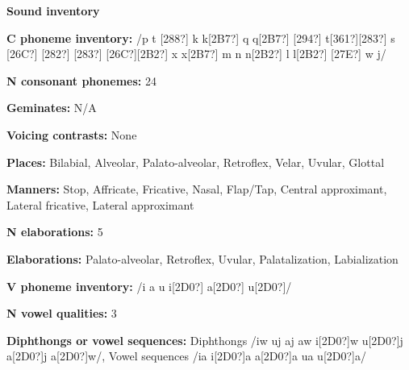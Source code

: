 \begin{styleBody}
\textbf{Sound inventory}
\end{styleBody}

\begin{styleBody}
\textbf{C phoneme inventory:} /p t [288?] k k[2B7?] q q[2B7?] [294?] t[361?][283?] s [26C?] [282?] [283?] [26C?][2B2?] x x[2B7?] m n n[2B2?] l l[2B2?] [27E?] w j/
\end{styleBody}

\begin{styleBody}
\textbf{N consonant phonemes:} 24
\end{styleBody}

\begin{styleBody}
\textbf{Geminates:} N/A
\end{styleBody}

\begin{styleBody}
\textbf{Voicing contrasts:} None
\end{styleBody}

\begin{styleBody}
\textbf{Places:} Bilabial, Alveolar, Palato-alveolar, Retroflex, Velar, Uvular, Glottal
\end{styleBody}

\begin{styleBody}
\textbf{Manners:} Stop, Affricate, Fricative, Nasal, Flap/Tap, Central approximant, Lateral fricative, Lateral approximant
\end{styleBody}

\begin{styleBody}
\textbf{N elaborations:} 5
\end{styleBody}

\begin{styleBody}
\textbf{Elaborations:} Palato-alveolar, Retroflex, Uvular, Palatalization, Labialization
\end{styleBody}

\begin{styleBody}
\textbf{V phoneme inventory:} /i a u i[2D0?] a[2D0?] u[2D0?]/
\end{styleBody}

\begin{styleBody}
\textbf{N vowel qualities:} 3
\end{styleBody}

\begin{styleBody}
\textbf{Diphthongs or vowel sequences:} Diphthongs /iw uj aj aw i[2D0?]w u[2D0?]j a[2D0?]j a[2D0?]w/, Vowel sequences /ia i[2D0?]a a[2D0?]a ua u[2D0?]a/
\end{styleBody}

